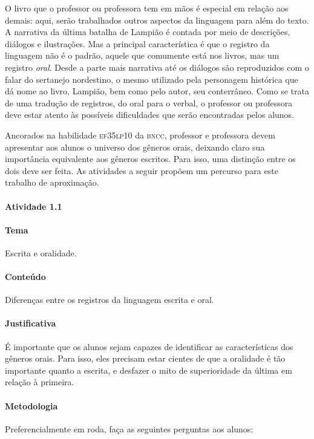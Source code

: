 \documentclass[11pt]{extarticle}
\begin{document}

O livro que o professor ou professora tem em mãos é especial em relação aos demais:
aqui, serão trabalhados outros aspectos da linguagem para além do texto.
A narrativa da última batalha de Lampião é contada por meio de descrições, diálogos
e ilustrações. Mas a principal característica é que o registro da linguagem não é
o padrão, aquele que comumente está nos livros, mas um registro \textit{oral}.
Desde a parte mais narrativa até os diálogos são reproduzidos com o falar
do sertanejo nordestino, o mesmo utilizado pela personagem histórica que dá nome 
ao livro, Lampião, bem como pelo autor, seu conterrâneo. 
Como se trata de uma tradução de registros, do oral para o verbal, o professor
ou professora deve estar atento às possíveis dificuldades que serão encontradas pelos alunos. 

Ancorados na habilidade \textsc{ef35lp10} da \textsc{bncc}, professor e professora devem apresentar aos
alunos o universo dos gêneros orais, deixando claro sua importância equivalente aos
gêneros escritos. Para isso, uma distinção entre os dois deve ser feita. 
As atividades a seguir propõem um percurso para este trabalho de aproximação. 


\paragraph{Atividade 1.1}


\paragraph{Tema} Escrita e oralidade.


\paragraph{Conteúdo} Diferenças entre os registros da linguagem escrita e oral. 


\paragraph{Justificativa} É importante que os alunos sejam capazes de
identificar as características dos gêneros orais. Para isso, 
eles precisam estar cientes de que a oralidade é tão importante quanto a escrita,
e desfazer o mito de superioridade da última em relação à primeira.


\paragraph{Metodologia} Preferencialmente em roda, faça as seguintes perguntas aos alunos: 
\end{document}
